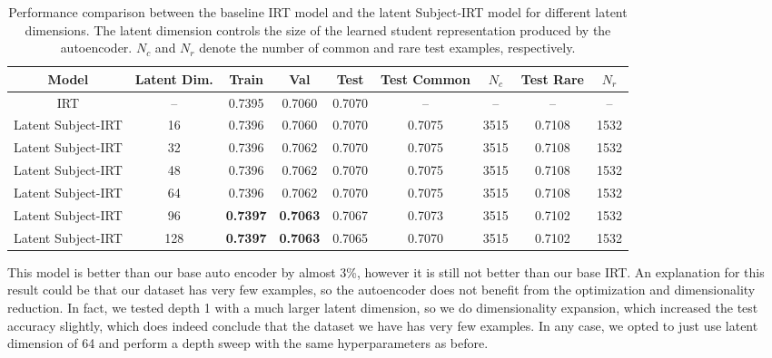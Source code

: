 \documentclass[11pt]{article}
\begin{document}
\begin{table}[H]
\centering
\small
\setlength{\tabcolsep}{4pt}
\begin{tabular}{c|c|ccc|cc|cc}
\hline
\textbf{Model} & \textbf{Latent Dim.}
& \textbf{Train} & \textbf{Val} & \textbf{Test}
& \textbf{Test Common} & \textbf{$N_c$}
& \textbf{Test Rare} & \textbf{$N_r$} \\
\hline

IRT & --
& 0.7395 & 0.7060 & 0.7070
& -- & --
& -- & -- \\

Latent Subject-IRT & 16
& 0.7396 & 0.7060 & 0.7070
& 0.7075 & 3515
& 0.7108 & 1532 \\

Latent Subject-IRT & 32
& 0.7396 & 0.7062 & 0.7070
& 0.7075 & 3515
& 0.7108 & 1532 \\

Latent Subject-IRT & 48
& 0.7396 & 0.7062 & 0.7070
& 0.7075 & 3515
& 0.7108 & 1532 \\

Latent Subject-IRT & 64
& 0.7396 & 0.7062 & 0.7070
& 0.7075 & 3515
& 0.7108 & 1532 \\

Latent Subject-IRT & 96
& \textbf{0.7397} & \textbf{0.7063} & 0.7067
& 0.7073 & 3515
& 0.7102 & 1532 \\

Latent Subject-IRT & 128
& \textbf{0.7397} & \textbf{0.7063} & 0.7065
& 0.7070 & 3515
& 0.7102 & 1532 \\

\hline
\end{tabular}
\caption{Performance comparison between the baseline IRT model and the latent Subject-IRT model for different latent dimensions. The latent dimension controls the size of the learned student representation produced by the autoencoder. $N_c$ and $N_r$ denote the number of common and rare test examples, respectively.}
\label{tab:latent_subject_results}
\end{table}

This model is better than our base auto encoder by almost 3\%, however it is still not better than our base IRT. An explanation for this result could be that our dataset has very few examples, so the autoencoder does not benefit from the optimization and dimensionality reduction. In fact, we tested depth 1 with a much larger latent dimension, so we do dimensionality expansion, which increased the test accuracy slightly, which does indeed conclude that the dataset we have has very few examples. In any case, we opted to just use latent dimension of 64 and perform a depth sweep with the same hyperparameters as before.
\end{document}
